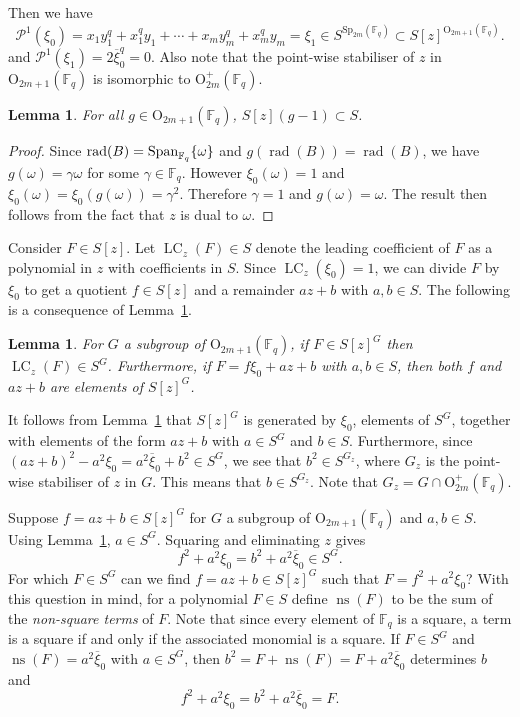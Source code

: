 \documentclass{amsart}
\newtheorem{lemma}[subsection]{Lemma}
\newcommand{\field}{\mathbb{F}}
\newcommand{\syp}[2]{{{\text{Sp}_{{#1}}(\field_{#2})}}}
\newcommand{\orthp}[2]{{{\text{O}^{+}_{{#1}}(\field_{#2})}}}
\newcommand{\orth}[2]{{{\text{O}_{{#1}}(\field_{#2})}}}
\newcommand{\PP}{\mathcal{P}}
\DeclareMathOperator{\ns}{ns}
\DeclareMathOperator{\lc}{LC}
\DeclareMathOperator{\rad}{rad}
\begin{document}
Then we have   
$$\PP^1(\xi_0)=x_1 y_1^q+x_1^qy_1+\cdots+x_m y_m^q+x_m^qy_m=\xi_1\in S^{\syp{2m}{q}}\subset S[z]^{\orth{2m+1}{q}}.$$
and $\PP^1(\xi_1)=2\overline{\xi}_0^q=0$.
Also note that the point-wise stabiliser of $z$ in $\orth{2m+1}{q}$ is isomorphic to $\orthp{2m}{q}$.


\begin{lemma} \label{terminal_var}
For all $g\in\orth{2m+1}{q}$, $S[z](g-1)\subset S$. 
\end{lemma}
\begin{proof} 
Since $\rad(B)={\rm Span}_{\field_q}\{\omega\}$ and 
$g(\rad(B))=\rad(B)$, we have $g(\omega)=\gamma \omega$ for some $\gamma\in\field_q$. 
However $\xi_0(\omega)=1$ and $\xi_0(\omega)=\xi_0(g(\omega))=\gamma^2$. Therefore $\gamma=1$ and $g(\omega)=\omega$.
The result then follows from the fact that $z$ is dual to $\omega$.
\end{proof}



Consider $F\in S[z]$. Let $\lc_z(F)\in S$ denote the leading coefficient of $F$ as a polynomial in $z$ with coefficients in $S$. 
Since $\lc_z(\xi_0)=1$, we can divide $F$ by $\xi_0$ to get a quotient $f\in S[z]$ and a remainder $az+b$ with $a,b\in S$.
The following is a consequence of Lemma~\ref{terminal_var}.

\begin{lemma} \label{quotient_lem}
For $G$ a subgroup of $\orth{2m+1}{q}$, if $F\in S[z]^G$ then $\lc_z(F)\in  S^G$.
Furthermore, if $F=f\xi_0 +az+b$ with $a,b\in S$, then both $f$ and $az+b$ are elements of $S[z]^G$.
\end{lemma}

It follows from Lemma~\ref{quotient_lem} that $S[z]^G$ is generated by $\xi_0$, elements of $S^G$, together with elements of the form $az+b$ with $a\in S^G$ and $b\in S$.
Furthermore, since $(az+b)^2-a^2\xi_0=a^2\overline{\xi}_0+b^2\in S^G$, we see that $b^2\in S^{G_z}$, where $G_z$ is the point-wise stabiliser of $z$ in $G$.
 This means that $b\in S^{G_z}$. Note that $G_z= G\cap \orthp{2m}{q}$.


Suppose $f=az+b\in S[z]^G$ for $G$ a subgroup of $\orth{2m+1}{q}$ and $a,b\in S$.
Using Lemma~\ref{quotient_lem}, $a\in S^G$. Squaring and eliminating $z$ gives 
$$f^2+a^2\xi_0=b^2+a^2\overline{\xi}_0\in S^G.$$ 
For which $F\in S^G$ can we find $f=az+b\in S[z]^G$ such that $F=f^2+a^2\xi_0$?
With this question in mind, for a polynomial $F\in S$ define $\ns(F)$ to be the sum of the {\it non-square terms} of $F$.
Note that since every element of $\field_q$ is a square, a term is a square if and only if the associated monomial is a square.
If $F\in S^G$ and $\ns(F)=a^2\overline{\xi}_0$ with $a \in S^G$, then $b^2=F+\ns(F)=F+a^2\overline{\xi}_0$
determines $b$ and
$$f^2+a^2\xi_0=b^2+a^2\overline{\xi}_0=F.$$
\end{document}
